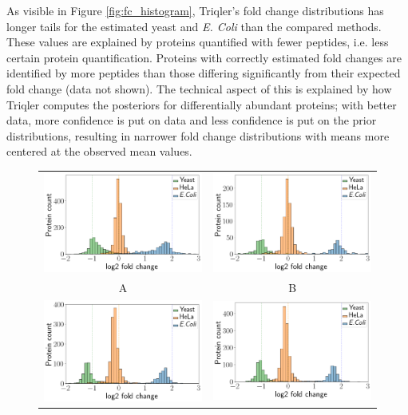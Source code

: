\documentclass[10pt,letterpaper]{article}
\begin{document}
As visible in Figure \ref{fig:fc_histogram}, Triqler's fold change distributions has longer tails for the estimated yeast and {\em E. Coli} than the compared methods. These values are explained by proteins quantified with fewer peptides, i.e. less certain protein quantification. Proteins with correctly estimated fold changes are identified by more peptides than those differing significantly from their expected fold change (data not shown). The technical aspect of this is explained by how Triqler computes the posteriors for differentially abundant proteins; with better data, more confidence is put on data and less confidence is put on the prior distributions, resulting in narrower fold change distributions with means more centered at the observed mean values. 


\begin{figure}[hbt]
    \centering
    \begin{tabular}{cc}
	    \includegraphics[width=0.4\linewidth]{../../result/report_plots_pipeline/histogram_ID_triqler.png} & 
	    \includegraphics[width=0.4\linewidth]{../../result/report_plots_pipeline/histogram_ID_top3.png} \\ 
        A & B \\ 
	    \includegraphics[width=0.4\linewidth]{../../result/report_plots_pipeline/histogram_ID_msstats.png} & 
	    \includegraphics[width=0.4\linewidth]{../../result/report_plots_pipeline/histogram_ID_msqrob2.png} \\

\end{tabular}
\end{figure}
\end{document}
